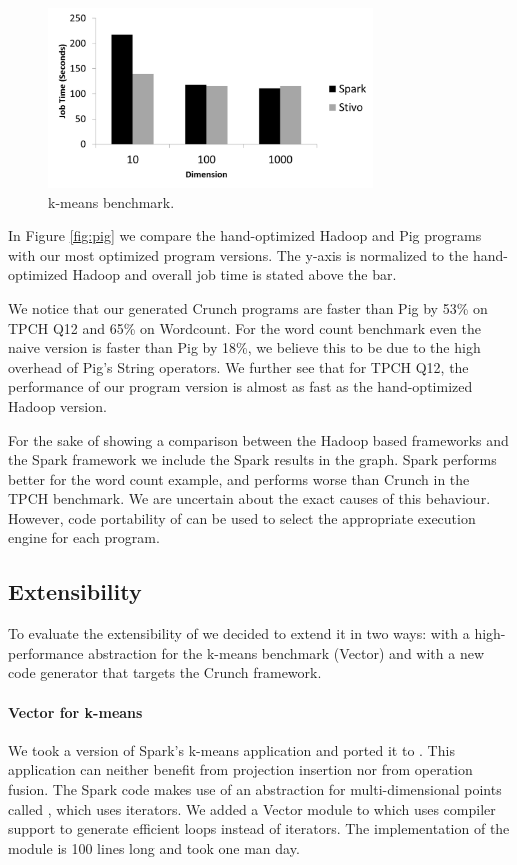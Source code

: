 \begin{figure}[t]
    \includegraphics[width=8.6cm]{figures/k-means}
   \caption{k-means benchmark.}
   \label{fig:k-means}%
\end{figure}

In Figure \ref{fig:pig} we compare the hand-optimized Hadoop and Pig programs
with our most optimized program versions.
The y-axis is normalized to the hand-optimized Hadoop and overall
job time is stated above the bar. 

We notice that our generated Crunch programs are faster than Pig by 53\% on
TPCH Q12 and 65\% on Wordcount. For the word count benchmark even the naive
version is faster than Pig by 18\%, we believe this to be due to the high
overhead of Pig's String operators. We further see that for TPCH Q12, the
performance of our program version is almost as fast as the hand-optimized
Hadoop version.

For the sake of showing a comparison between the Hadoop based frameworks
and the Spark framework we include the Spark results in the graph. Spark
performs better for the word count example, and performs worse than Crunch in
the TPCH benchmark. We are uncertain about the exact causes of this behaviour.
However, code portability of \tool can be used to select the appropriate
execution engine for each program. 

\subsection{Extensibility}
\label{subsec:kmeans}

To evaluate the extensibility of \tool we decided to extend it in two ways: 
with a high-performance abstraction for the k-means benchmark (Vector) and
with a new code generator that targets the Crunch framework.
 
\paragraph{Vector for k-means} 
We took a version of Spark's k-means \cite{spark-nsdi} application and
ported it to \tool. This application can neither benefit from projection
insertion nor from operation fusion. The Spark code makes use of an abstraction
for multi-dimensional points called , which uses iterators. We added
a Vector module to \tool which uses compiler support to generate efficient loops
instead of iterators. The implementation of the  module is 100
lines long and took one man day.

